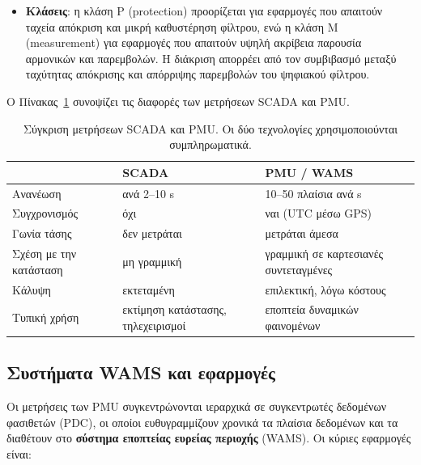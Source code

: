 \begin{itemize}
\item \textbf{Κλάσεις}: η κλάση P (protection) προορίζεται για εφαρμογές που απαιτούν ταχεία
      απόκριση και μικρή καθυστέρηση φίλτρου, ενώ η κλάση M (measurement) για εφαρμογές
      που απαιτούν υψηλή ακρίβεια παρουσία αρμονικών και παρεμβολών. Η διάκριση απορρέει
      από τον συμβιβασμό μεταξύ ταχύτητας απόκρισης και απόρριψης παρεμβολών του
      ψηφιακού φίλτρου.
\end{itemize}

Ο Πίνακας~\ref{tab:scada-pmu} συνοψίζει τις διαφορές των μετρήσεων SCADA και PMU.

\begin{table}[!htbp]
\centering
\begin{tabular}{lll}
\hline
 & SCADA & PMU / WAMS \\
\hline
Ανανέωση         & ανά 2--10 s        & 10--50 πλαίσια ανά s \\
Συγχρονισμός     & όχι                & ναι (UTC μέσω GPS) \\
Γωνία τάσης      & δεν μετράται       & μετράται άμεσα \\
Σχέση με την κατάσταση & μη γραμμική & γραμμική σε καρτεσιανές συντεταγμένες \\
Κάλυψη           & εκτεταμένη         & επιλεκτική, λόγω κόστους \\
Τυπική χρήση     & εκτίμηση κατάστασης, τηλεχειρισμοί & εποπτεία δυναμικών φαινομένων \\
\hline
\end{tabular}
\caption{Σύγκριση μετρήσεων SCADA και PMU. Οι δύο τεχνολογίες χρησιμοποιούνται
συμπληρωματικά.}
\label{tab:scada-pmu}
\end{table}

\subsection{Συστήματα WAMS και εφαρμογές}

Οι μετρήσεις των PMU συγκεντρώνονται ιεραρχικά σε συγκεντρωτές δεδομένων φασιθετών (PDC), οι
οποίοι ευθυγραμμίζουν χρονικά τα πλαίσια δεδομένων και τα διαθέτουν στο \textbf{σύστημα
εποπτείας ευρείας περιοχής} (WAMS). Οι κύριες εφαρμογές είναι:

